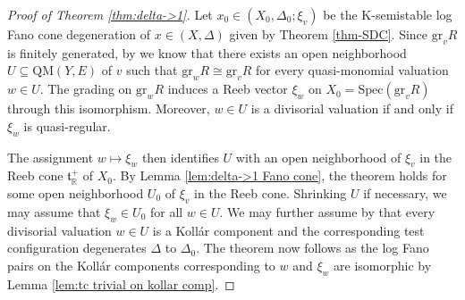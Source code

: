 \documentclass[12pt]{amsart}
\theoremstyle{definition}
\newtheorem{emp}[prop]{}
\newcommand{\bR}{\mathbb{R}}
\newcommand{\ft}{\mathfrak{t}}
\newcommand{\Spec}{\mathrm{Spec}}
\newcommand{\gr}{\mathrm{gr}}
\newcommand{\QM}{\mathrm{QM}}
\numberwithin{equation}{section}
\begin{document}
\begin{proof}[Proof of Theorem \ref{thm:delta->1}]
Let $x_0\in (X_0,\Delta_0;\xi_v)$ be the K-semistable log Fano cone degeneration of $x\in (X,\Delta)$ given by Theorem \ref{thm-SDC}. Since $\gr_{v} R$ is finitely generated, by \cite[Lemma 2.10]{LX-higher-rank} we know that there exists an open neighborhood $U\subseteq \QM(Y,E)$ of $v$ such that $\gr_w R\cong \gr_{v} R$ for every quasi-monomial valuation $w\in U$. The grading on $\gr_w R$ induces a Reeb vector $\xi_w$ on $X_0=\Spec(\gr_v R)$ through this isomorphism. Moreover, $w\in U$ is a divisorial valuation if and only if $\xi_w$ is quasi-regular. 

The assignment $w\mapsto \xi_w$ then identifies $U$ with an open neighborhood of $\xi_v$ in the Reeb cone $\ft_\bR^+$ of $X_0$. By Lemma \ref{lem:delta->1 Fano cone}, the theorem holds for some open neighborhood $U_0$ of $\xi_v$ in the Reeb cone. Shrinking $U$ if necessary, we may assume that  $\xi_w\in U_0$ for all $w\in U$. We may further assume by \cite[Proposition 2.59]{LX-higher-rank} that every divisorial valuation $w\in U$ is a Koll\'ar component and the corresponding test configuration degenerates $\Delta$ to $\Delta_0$. The theorem now follows as the log Fano pairs on the Koll\'ar components corresponding to $w$ and $\xi_w$ are isomorphic by Lemma \ref{lem:tc trivial on kollar comp}.
\end{proof}

\end{document}
